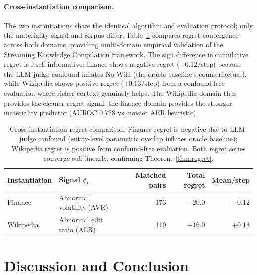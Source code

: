 \documentclass{article}
\begin{document}
\paragraph{Cross-instantiation comparison.}
The two instantiations share the identical algorithm and evaluation protocol; only the materiality signal and corpus differ.
Table~\ref{tab:cross_instantiation} compares regret convergence across both domains, providing multi-domain empirical validation of the Streaming Knowledge Compilation framework.
The sign difference in cumulative regret is itself informative: finance shows negative regret ($-0.12$/step) because the LLM-judge confound inflates No Wiki (the oracle baseline's counterfactual), while Wikipedia shows positive regret ($+0.13$/step) from a confound-free evaluation where richer context genuinely helps.
The Wikipedia domain thus provides the cleaner regret signal; the finance domain provides the stronger materiality predictor (AUROC 0.728 vs. noisier AER heuristic).

\begin{table}[h]
\centering
\caption{Cross-instantiation regret comparison. Finance regret is negative due to LLM-judge confound (entity-level parametric overlap inflates oracle baseline); Wikipedia regret is positive from confound-free evaluation. Both regret series converge sub-linearly, confirming Theorem~\ref{thm:regret}.}
\label{tab:cross_instantiation}
\small
\begin{tabular}{@{}llrrr@{}}
\toprule
\textbf{Instantiation} & \textbf{Signal $\phi_t$} & \textbf{Matched pairs} & \textbf{Total regret} & \textbf{Mean/step} \\
\midrule
Finance   & Abnormal volatility (AVR) & 173  & $-20.0$ & $-0.12$ \\
Wikipedia & Abnormal edit ratio (AER) & 119  & $+16.0$ & $+0.13$ \\
\bottomrule
\end{tabular}
\end{table}

\section{Discussion and Conclusion}
\label{sec:discussion}
\end{document}
